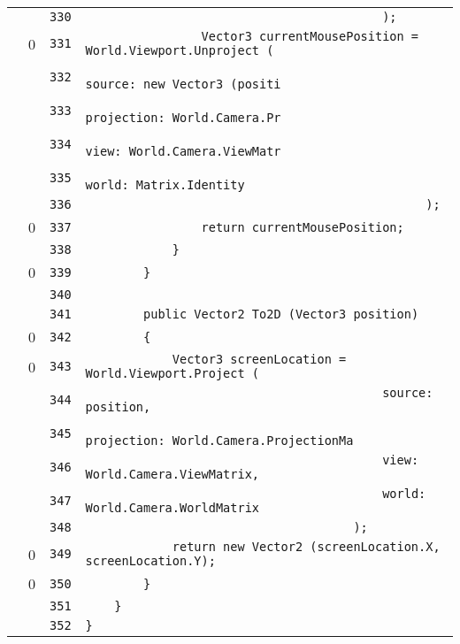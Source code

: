 \documentclass[a4paper,10pt]{article}
\begin{document}
\begin{longtable}[l]{lrrl}
\cellcolor{gray} &  & \verb~330~ & \verb~                                         );~\\
\cellcolor{red} & 0 & \verb~331~ & \verb~                Vector3 currentMousePosition = World.Viewport.Unproject (~\\
\cellcolor{gray} &  & \verb~332~ & \verb~                                                   source: new Vector3 (positi~\\
\cellcolor{gray} &  & \verb~333~ & \verb~                                                   projection: World.Camera.Pr~\\
\cellcolor{gray} &  & \verb~334~ & \verb~                                                   view: World.Camera.ViewMatr~\\
\cellcolor{gray} &  & \verb~335~ & \verb~                                                   world: Matrix.Identity~\\
\cellcolor{gray} &  & \verb~336~ & \verb~                                               );~\\
\cellcolor{red} & 0 & \verb~337~ & \verb~                return currentMousePosition;~\\
\cellcolor{gray} &  & \verb~338~ & \verb~            }~\\
\cellcolor{red} & 0 & \verb~339~ & \verb~        }~\\
\cellcolor{gray} &  & \verb~340~ & \verb~~\\
\cellcolor{gray} &  & \verb~341~ & \verb~        public Vector2 To2D (Vector3 position)~\\
\cellcolor{red} & 0 & \verb~342~ & \verb~        {~\\
\cellcolor{red} & 0 & \verb~343~ & \verb~            Vector3 screenLocation = World.Viewport.Project (~\\
\cellcolor{gray} &  & \verb~344~ & \verb~                                         source: position,~\\
\cellcolor{gray} &  & \verb~345~ & \verb~                                         projection: World.Camera.ProjectionMa~\\
\cellcolor{gray} &  & \verb~346~ & \verb~                                         view: World.Camera.ViewMatrix,~\\
\cellcolor{gray} &  & \verb~347~ & \verb~                                         world: World.Camera.WorldMatrix~\\
\cellcolor{gray} &  & \verb~348~ & \verb~                                     );~\\
\cellcolor{red} & 0 & \verb~349~ & \verb~            return new Vector2 (screenLocation.X, screenLocation.Y);~\\
\cellcolor{red} & 0 & \verb~350~ & \verb~        }~\\
\cellcolor{gray} &  & \verb~351~ & \verb~    }~\\
\cellcolor{gray} &  & \verb~352~ & \verb~}~\\
\end{longtable}
\newpage
\end{document}
